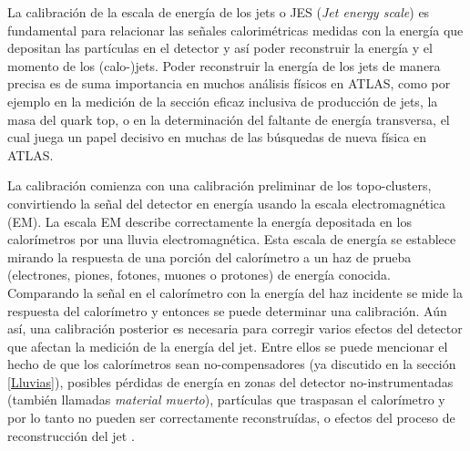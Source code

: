 La calibración de la escala de energía de los jets o JES (\textit{Jet energy scale}) es fundamental para relacionar las señales calorimétricas medidas con la energía que depositan las partículas en el detector y así poder reconstruir la energía y el momento de los (calo-)jets. Poder reconstruir la energía de los jets de manera precisa es de suma importancia en muchos análisis físicos en ATLAS, como por ejemplo en la medición de la sección eficaz inclusiva de producción de jets, la masa del quark top, o en la determinación del faltante de energía transversa, el cual juega un papel decisivo en muchas de las búsquedas de nueva física en ATLAS.

La calibración comienza con una calibración preliminar de los topo-clusters, convirtiendo la señal del detector en energía usando la escala electromagnética (EM). La escala EM describe correctamente la energía depositada en los calorímetros por una lluvia electromagnética. Esta escala de energía se establece mirando la respuesta de una porción del calorímetro a un haz de prueba (electrones, piones, fotones, muones o protones) de energía conocida. Comparando la señal en el calorímetro con la energía del haz incidente se mide la respuesta del calorímetro y entonces se puede determinar una calibración. Aún así, una calibración posterior es necesaria para corregir varios efectos del detector que afectan la medición de la energía del jet. Entre ellos se puede mencionar el hecho de que los calorímetros sean no-compensadores (ya discutido en la sección \ref{Lluvias}), posibles pérdidas de energía en zonas del detector no-instrumentadas (también llamadas \textit{material muerto}), partículas que traspasan el calorímetro y por lo tanto no pueden ser correctamente reconstruídas, o efectos del proceso de reconstrucción del jet \cite{Performance}. 

